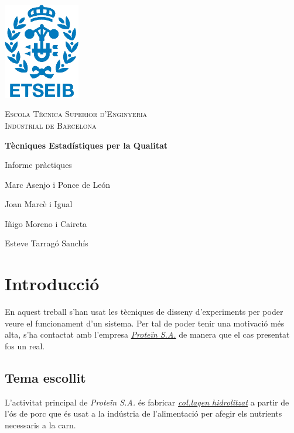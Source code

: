 \documentclass[a4paper]{article}
\begin{document}
\begin{titlepage}
	\centering
	\vspace{1cm}
	\includegraphics[width=0.25\textwidth]{images/etseib}
	\par\vspace{1cm}
	\textsc{ \LARGE Escola Tècnica Superior d'Enginyeria \\[1em] 
		Industrial de Barcelona}
	\par\vspace{2cm}
	\textbf{\Huge Tècniques Estadístiques per la Qualitat}
	\par\vspace{2cm}
	{\LARGE Informe pràctiques}
	\vfill
	\begin{flushright}
		\large
		Marc Asenjo i Ponce de León \par
		Joan Marcè i Igual \par
		Iñigo Moreno i Caireta \par
		Esteve Tarragó Sanchís \par
	\end{flushright}
\end{titlepage}

\tableofcontents
\pagebreak

\section{Introducció}
En aquest treball s'han usat les tècniques de disseny d'experiments per poder veure el funcionament d'un sistema. Per tal de poder tenir una motivació més alta, s'ha contactat amb l'empresa \emph{\href{http://www.protein.es/}{Proteïn S.A.}} de manera que el cas presentat fos un real. 

\subsection{Tema escollit}
L'activitat principal de \emph{Proteïn S.A.} és fabricar  \emph{\href{https://es.wikipedia.org/wiki/Col\%C3\%A1geno_hidrolizado}{co\l.lagen hidrolitzat}} a partir de l'ós de porc que és usat a la indústria de l'alimentació per afegir els nutrients necessaris a la carn. 
\end{document}

